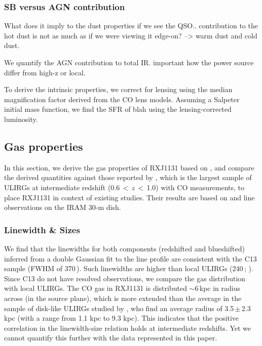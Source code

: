 \documentclass[]{emulateapj}
\begin{document}
\subsubsection{SB versus AGN contribution}
What does it imply to the dust properties if we see the QSO.. contribution to the hot dust is not as much as if we were viewing it edge-on? --> warm dust and cold dust.

We quantify the AGN contribution to total IR.
important how the power source differ from high-z or local.



To derive the intrinsic properties, we correct for lensing using the
median magnification factor derived from the CO lens models.
Assuming a Salpeter initial mass function, we find the SFR of blah using the
lensing-corrected \fir luminosity.


\subsection{Gas properties}
In this section, we derive the gas properties of RXJ1131 based on \bco,
and compare the derived quantities against those reported by
\citet[hereafter C13]{Combes13a}, which is the largest sample of
ULIRGs at intermediate redshift (0.6\,$<$\,$z$\,$<$\,1.0) with CO measurements,
to place RXJ1131 in context of existing studies. Their results are
based on \bco and  line observations on the IRAM 30-m dish.

\subsubsection{Linewidth \& Sizes}
We find that the linewidths for both components (redshifted and blueshifted)
inferred from a double Gaussian fit to the line profile are
consistent with the C13 sample (FWHM of 370\,\kms). Such linewidths are higher
than local ULIRGs (240\,\kms; \citealt[][]{Solomon97a}).
Since C13 do not have resolved observations, we compare the
gas distribution with local ULIRGs. The CO gas in RXJ1131 is
distributed $\sim$6\,kpc in radius across (in
the source plane), which is more extended than the average in the
sample of disk-like ULIRGs studied by \citet{Ueda14a},
who find an average radius of 3.5\,$\pm$\,2.3\,kpc
(with a range from 1.1 kpc to 9.3 kpc).
This indicates that the positive correlation in the linewidth-size relation
holds at intermediate redshifts. Yet we cannot quantify this further
with the data represented in this paper.
\end{document}
